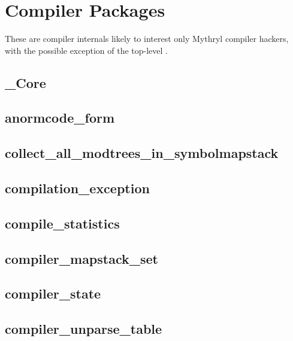 \section{Compiler Packages}

%
%

These are compiler internals likely to interest 
only Mythryl compiler hackers, with the possible exception of 
the top-level .


\subsection{\_Core}						
\subsection{anormcode\_form}					
\subsection{collect\_all\_modtrees\_in\_symbolmapstack}		
\subsection{compilation\_exception}				
\subsection{compile\_statistics}				
\subsection{compiler\_mapstack\_set}				
\subsection{compiler\_state}					
\subsection{compiler\_unparse\_table}				
